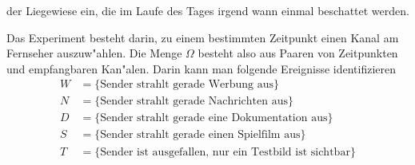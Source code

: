 \begin{loesung}
\begin{teilaufgaben}
der Liegewiese ein, die im Laufe des Tages irgend wann einmal beschattet 
werden.
\item 
Das Experiment besteht darin, zu einem bestimmten Zeitpunkt
einen Kanal am Fernseher auszuw"ahlen.
Die Menge $\Omega$ besteht also aus Paaren von Zeitpunkten und
empfangbaren Kan"alen.
Darin kann man folgende Ereignisse identifizieren
\begin{align*}
W&=\{\text{Sender strahlt gerade Werbung aus}\}\\
N&=\{\text{Sender strahlt gerade Nachrichten aus}\}\\
D&=\{\text{Sender strahlt gerade eine Dokumentation aus}\}\\
S&=\{\text{Sender strahlt gerade einen Spielfilm aus}\}\\
T&=\{\text{Sender ist ausgefallen, nur ein Testbild ist sichtbar}\}
\end{align*}
\end{teilaufgaben}
\end{loesung}


